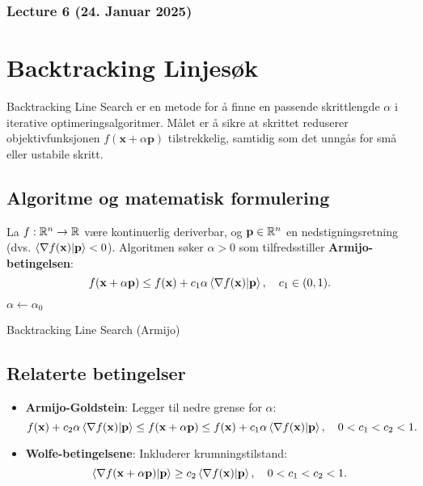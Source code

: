 
\subsubsection{Lecture 6 (24. Januar 2025)}

\section*{Backtracking Linjesøk}
Backtracking Line Search er en metode for å finne en passende skrittlengde \( \alpha \) i iterative optimeringsalgoritmer. Målet er å sikre at skrittet reduserer objektivfunksjonen \( f(\bm{x} + \alpha \bm{p}) \) tilstrekkelig, samtidig som det unngås for små eller ustabile skritt.

\subsection*{Algoritme og matematisk formulering}
La \( f: \mathbb{R}^n \to \mathbb{R} \) være kontinuerlig deriverbar, og \( \mathbf{p} \in \mathbb{R}^n \) en nedstigningsretning (dvs. \( \ip{\nabla f(\bm{x})}{\bm{p}} < 0 \)). Algoritmen søker \( \alpha > 0 \) som tilfredsstiller \textbf{Armijo-betingelsen}:
\begin{equation}
    f(\bm{x} + \alpha \bm{p}) \leq f(\bm{x}) + c_1 \alpha \ip{\nabla f(\bm{x})}{\bm{p}}, \quad c_1 \in (0, 1).
\end{equation}

\begin{algorithm}[H]
    \SetAlgoLined
    \DontPrintSemicolon
    \KwOut{$\alpha$}
    $\alpha \leftarrow \alpha_0$\;
    \Return{$\alpha$}
    \caption{Backtracking Line Search (Armijo)}
\end{algorithm}

\subsection*{Relaterte betingelser}
\begin{itemize}
    \item \textbf{Armijo-Goldstein}: Legger til nedre grense for \( \alpha \):
          \begin{equation}
              f(\bm{x}) + c_2 \alpha \ip{\nabla f(\bm{x})}{\bm{p}} \leq f(\bm{x} + \alpha \bm{p}) \leq f(\bm{x}) + c_1 \alpha \ip{\nabla f(\bm{x})}{\bm{p}}, \quad 0 < c_1 < c_2 < 1.
          \end{equation}

    \item \textbf{Wolfe-betingelsene}: Inkluderer krumningstilstand:
          \begin{equation}
              \ip{\nabla f(\bm{x} + \alpha \bm{p})}{\bm{p}} \geq c_2 \ip{\nabla f(\bm{x})}{\bm{p}}, \quad 0 < c_1 < c_2 < 1.
          \end{equation}
\end{itemize}

